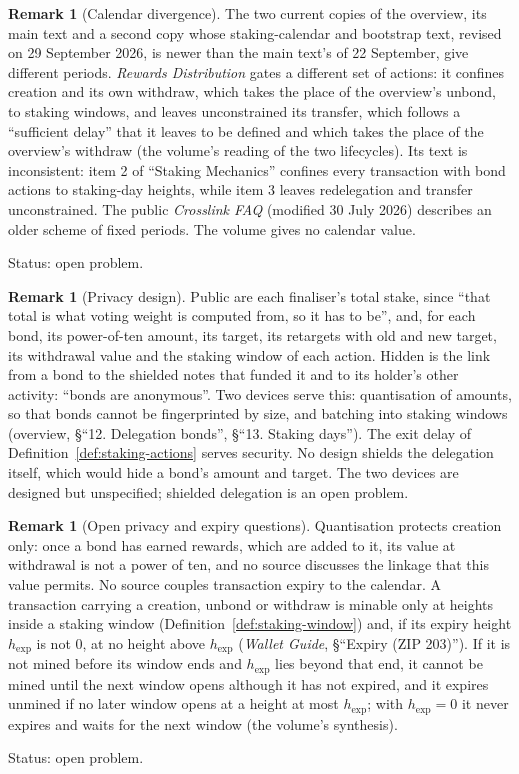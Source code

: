 \documentclass[11pt,a4paper]{article}
\theoremstyle{definition}
\newtheorem{remark}[theorem]{Remark}
\begin{document}
\begin{remark}[Calendar divergence]\label{rem:calendar}
The two current copies of the overview, its main text and a second copy
whose staking-calendar and bootstrap text, revised on 29 September 2026, is
newer than the main text's of 22 September, give different periods.
\emph{Rewards Distribution} gates a different set of actions: it confines
creation and its own withdraw, which takes the place of the overview's unbond,
to staking windows, and leaves unconstrained its transfer, which follows a
``sufficient delay'' that it leaves to be defined and which takes the place of
the overview's withdraw (the volume's reading of the two lifecycles). Its text
is inconsistent: item 2 of ``Staking Mechanics'' confines every transaction with
bond actions to staking-day heights, while item 3 leaves redelegation and
transfer unconstrained. The public \emph{Crosslink FAQ} (modified 30 July 2026)
describes an older scheme of fixed periods.
The volume gives no calendar value.

Status: open problem.
\end{remark}

\begin{remark}[Privacy design]\label{rem:staking-privacy}
Public are each finaliser's total stake, since ``that total is what voting
weight is computed from, so it has to be'', and, for each bond, its
power-of-ten amount, its target, its retargets with old and new target, its
withdrawal value and the staking window of each action. Hidden is the link
from a bond to the shielded notes that funded it and to its holder's other
activity: ``bonds are anonymous''. Two devices serve this: quantisation of
amounts, so that bonds cannot be fingerprinted by size, and batching into
staking windows (overview, \S``12. Delegation bonds'', \S``13. Staking days'').
The exit delay of Definition~\ref{def:staking-actions} serves security. No
design shields the delegation itself, which would hide a bond's amount and
target. The two devices are designed but unspecified; shielded delegation
is an open problem.
\end{remark}

\begin{remark}[Open privacy and expiry questions]\label{rem:staking-open}
Quantisation protects creation only: once a bond has earned rewards, which
are added to it, its value at withdrawal is not a power of ten, and no source
discusses the linkage that this value permits. No source couples
transaction expiry to the calendar. A transaction carrying a creation,
unbond or withdraw is minable only at heights inside a staking window
(Definition~\ref{def:staking-window}) and, if its expiry height
$h_{\mathrm{exp}}$ is not $0$, at no height above $h_{\mathrm{exp}}$
(\emph{Wallet Guide}, \S``Expiry (ZIP 203)'').
If it is not mined before its window ends and $h_{\mathrm{exp}}$ lies beyond
that end, it cannot be mined until the next window opens although it has not
expired, and it expires unmined if no later window opens at a height at most
$h_{\mathrm{exp}}$; with $h_{\mathrm{exp}} = 0$ it never expires and waits for
the next window (the volume's synthesis).

Status: open problem.
\end{remark}
\end{document}
